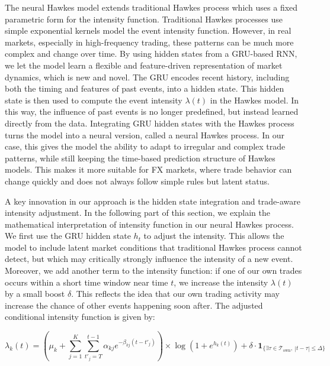 The neural Hawkes model extends traditional Hawkes process which uses a fixed parametric form for the intensity function. Traditional Hawkes processes use simple exponential kernels model the event intensity function. However, in real markets, especially in high-frequency trading, these patterns can be much more complex and change over time. By using hidden states from a GRU-based RNN, we let the model learn a flexible and feature-driven representation of market dynamics, which is new and novel. The GRU encodes recent history, including both the timing and features of past events, into a hidden state. This hidden state is then used to compute the event intensity $\lambda(t)$ in the Hawkes model. In this way, the influence of past events is no longer predefined, but instead learned directly from the data. Integrating GRU hidden states with the Hawkes process turns the model into a neural version, called a neural Hawkes process. In our case, this gives the model the ability to adapt to irregular and complex trade patterns, while still keeping the time-based prediction structure of Hawkes models. This makes it more suitable for FX markets, where trade behavior can change quickly and does not always follow simple rules but latent status.


A key innovation in our approach is the hidden state integration and trade-aware intensity adjustment. In the following part of this section, we explain the mathematical interpretation of intensity function in our neural Hawkes process. We first use the GRU hidden state $h_t$ to adjust the intensity. This allows the model to include latent market conditions that traditional Hawkes process cannot detect, but which may critically strongly influence the intensity of a new event. Moreover, we add another term to the intensity function: if one of our own trades occurs within a short time window near time $t$, we increase the intensity $\lambda(t)$ by a small boost $\delta$. This reflects the idea that our own trading activity may increase the chance of other events happening soon after. The adjusted conditional intensity function is given by:

\begin{equation}
    \lambda_k(t) = (\mu_k + \sum_{j=1}^{K} \sum_{t'_j=T}^{t-1} \alpha_{kj} e^{-\beta_{kj}(t - t'_j)}) \times \log(1+e^{h_k(t)}) + \delta \cdot \mathbf{1}_{\{\exists \tau \in \mathcal{T}_{\text{own}},\ |t - \tau| \leq \Delta \}}
    \label{eq:intensity}
\end{equation}

